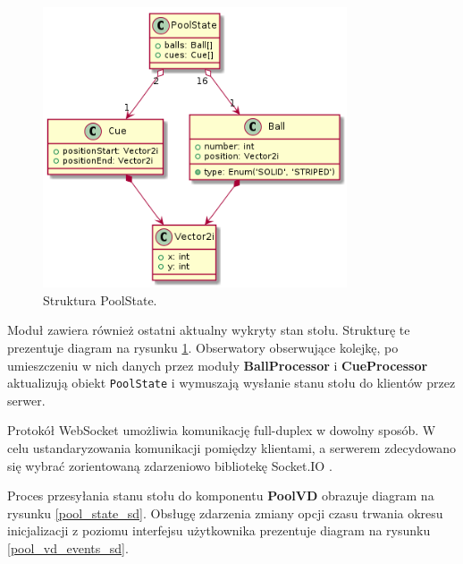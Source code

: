 \documentclass[12pt]{article}
\begin{document}
\begin{figure}[!ht]
    \centering
    \includegraphics[width=9cm]{./diagrams/out/pull_state_cd.png}
    \caption{Struktura PoolState.}
    \label{poolstate}
\end{figure}

Moduł zawiera również ostatni aktualny wykryty stan stołu. Strukturę te prezentuje diagram na rysunku \ref{poolstate}.
Obserwatory obserwujące kolejkę, po umieszczeniu w nich danych przez moduły \textbf{BallProcessor} i \textbf{CueProcessor} aktualizują obiekt \lstinline{PoolState} i wymuszają wysłanie stanu stołu do klientów przez serwer.

Protokół WebSocket umożliwia komunikację full-duplex w dowolny sposób. W celu ustandaryzowania komunikacji pomiędzy klientami, a serwerem zdecydowano się wybrać zorientowaną zdarzeniowo bibliotekę Socket.IO \cite{socket.io}.

Proces przesyłania stanu stołu do komponentu \textbf{PoolVD} obrazuje diagram na rysunku \ref{pool_state_sd}. Obsługę zdarzenia zmiany opcji czasu trwania okresu inicjalizacji z poziomu interfejsu użytkownika prezentuje diagram na rysunku \ref{pool_vd_events_sd}.
\end{document}
